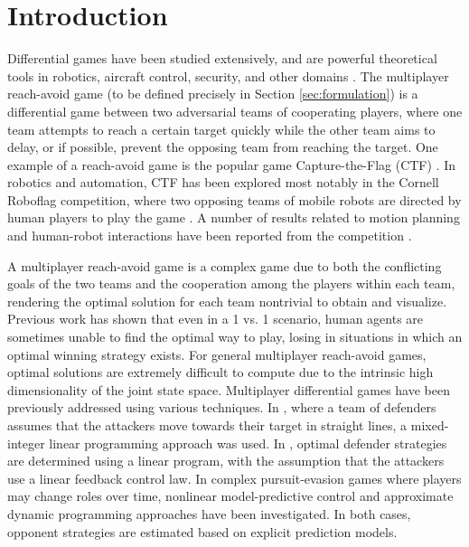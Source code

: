 \section{Introduction}
\label{sec:intro}
Differential games have been studied extensively, and are powerful theoretical tools in robotics, aircraft control, security, and other domains \cite{OFTHEAIRFORCEWASHINGTON:2009p37, Erzberger:2006p44, kiva2009}. The multiplayer reach-avoid game (to be defined precisely in Section \ref{sec:formulation}) is a differential game between two adversarial teams of cooperating players, where one team attempts to reach a certain target quickly while the other team aims to delay, or if possible, prevent the opposing team from reaching the target. One example of a reach-avoid game is the popular game Capture-the-Flag (CTF) \cite{HThesis, Huang2011}. In robotics and automation, CTF has been explored most notably in the Cornell Roboflag competition, where two opposing teams of mobile robots are directed by human players to play the game \cite{DAndrea:2003p95}. A number of results related to motion planning and human-robot interactions have been reported from the competition \cite{Earl:2007p101, Campbell:2003p5, Waydo:2003p97, Parasuraman:2005p99}. 

A multiplayer reach-avoid game is a complex game due to both the conflicting goals of the two teams and the cooperation among the players within each team, rendering the optimal solution for each team nontrivial to obtain and visualize. Previous work \cite{HThesis, Huang2011} has shown that even in a 1 vs. 1 scenario, human agents are sometimes unable to find the optimal way to play, losing in situations in which an optimal winning strategy exists. For general multiplayer reach-avoid games, optimal solutions are extremely difficult to compute due to the intrinsic high dimensionality of the joint state space. Multiplayer differential games have been previously addressed using various techniques. 
In \cite{Earl:2007p101}, where a team of defenders assumes that the attackers move towards their target in straight lines, a mixed-integer linear programming approach was used. In \cite{Chasparis:2005p102}, optimal defender strategies are determined using a linear program, with the assumption that the attackers use a linear feedback control law. In complex pursuit-evasion games where players may change roles over time, nonlinear model-predictive control \cite{Sprinkle:2004p100} and approximate dynamic programming \cite{McGrew:2008p103} approaches have been investigated. In both cases, opponent strategies are estimated based on explicit prediction models.

